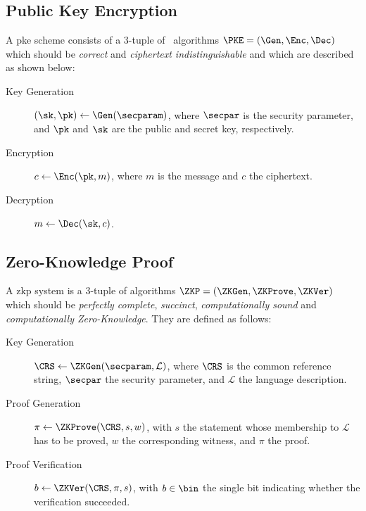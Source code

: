 \subsection{Public Key Encryption}
A \gls{pke} scheme consists of a 3-tuple of \ppt ~algorithms $\PKE=(\Gen, \Enc, \Dec)$ which should be \textit{correct} and \textit{ciphertext indistinguishable} and which are described as shown below:
\begin{description}
	\item[Key Generation]
	$(\sk,\pk) \gets \Gen(\secparam)$, where $\secpar$ is the security parameter, and $\pk$ and $\sk$ are the public and secret key, respectively.
	\item[Encryption]
	$c \gets \Enc(\pk,m)$, where $m$ is the message and $c$ the ciphertext.
	\item[Decryption]
	$m \gets \Dec(\sk,c)$.
\end{description}

\subsection{Zero-Knowledge Proof}
\label{sec:preliminary_zkp}
A \gls{zkp} system is a 3-tuple of algorithms $\ZKP = (\ZKGen, \ZKProve, \ZKVer)$ which should be \textit{perfectly complete}, \textit{succinct}, \textit{computationally sound} and \textit{computationally Zero-Knowledge}. They are defined as follows:
\begin{description}
	\item[Key Generation]
	$\CRS \gets \ZKGen(\secparam, \mathcal{L})$, where $\CRS$ is the common reference string, $\secpar$ the security parameter, and $\mathcal{L}$ the language description.
	\item[Proof Generation]
	$\pi \gets \ZKProve(\CRS, s, w)$, with $s$ the statement whose membership to $\mathcal{L}$ has to be proved, $w$ the corresponding witness, and $\pi$ the proof.
	\item[Proof Verification]
	$b \gets \ZKVer (\CRS, \pi, s)$, with $b \in \bin$ the single bit indicating whether the verification succeeded.
\end{description}